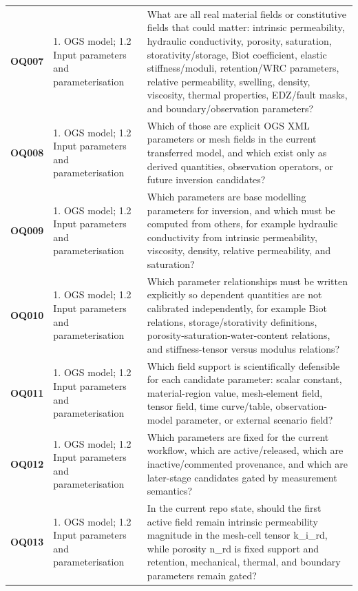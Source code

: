 \begin{longtable}{@{}L{0.10\textwidth} L{0.23\textwidth} L{0.59\textwidth}@{}}
\addlinespace[0.16em]
\textbf{OQ007} & 1. OGS model; 1.2 Input parameters and parameterisation & What are all real material fields or constitutive fields that could matter: intrinsic permeability, hydraulic conductivity, porosity, saturation, storativity/storage, Biot coefficient, elastic stiffness/moduli, retention/WRC parameters, relative permeability, swelling, density, viscosity, thermal properties, EDZ/fault masks, and boundary/observation parameters?\\
\addlinespace[0.16em]
\textbf{OQ008} & 1. OGS model; 1.2 Input parameters and parameterisation & Which of those are explicit OGS XML parameters or mesh fields in the current transferred model, and which exist only as derived quantities, observation operators, or future inversion candidates?\\
\addlinespace[0.16em]
\textbf{OQ009} & 1. OGS model; 1.2 Input parameters and parameterisation & Which parameters are base modelling parameters for inversion, and which must be computed from others, for example hydraulic conductivity from intrinsic permeability, viscosity, density, relative permeability, and saturation?\\
\addlinespace[0.16em]
\textbf{OQ010} & 1. OGS model; 1.2 Input parameters and parameterisation & Which parameter relationships must be written explicitly so dependent quantities are not calibrated independently, for example Biot relations, storage/storativity definitions, porosity-saturation-water-content relations, and stiffness-tensor versus modulus relations?\\
\addlinespace[0.16em]
\textbf{OQ011} & 1. OGS model; 1.2 Input parameters and parameterisation & Which field support is scientifically defensible for each candidate parameter: scalar constant, material-region value, mesh-element field, tensor field, time curve/table, observation-model parameter, or external scenario field?\\
\addlinespace[0.16em]
\textbf{OQ012} & 1. OGS model; 1.2 Input parameters and parameterisation & Which parameters are fixed for the current workflow, which are active/released, which are inactive/commented provenance, and which are later-stage candidates gated by measurement semantics?\\
\addlinespace[0.16em]
\textbf{OQ013} & 1. OGS model; 1.2 Input parameters and parameterisation & In the current repo state, should the first active field remain intrinsic permeability magnitude in the mesh-cell tensor k\_i\_rd, while porosity n\_rd is fixed support and retention, mechanical, thermal, and boundary parameters remain gated?\\

\end{longtable}
